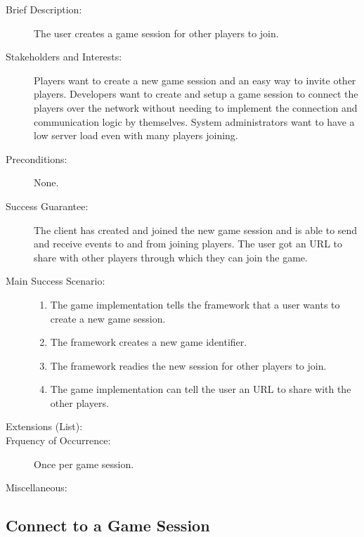 \begin{description}
  \item[Brief Description:] The user creates a game session for other players
  to join.
  \item[Stakeholders and Interests:] Players want to create a new game session
  and an easy way to invite other players. Developers want to create and setup a
  game session to connect the players over the network without needing to
  implement the connection and communication logic by themselves. System
  administrators want to have a low server load even with many players joining.
  \item[Preconditions:] None.
  \item[Success Guarantee:] The client has created and joined the new game
  session and is able to send and receive events to and from joining players.
  The user got an URL to share with other players through which they can join
  the game.
  \item[Main Success Scenario:] \hfill
  \begin{enumerate}
    \item The game implementation tells the framework that a user wants to
    create a new game session.
    \item The framework creates a new game identifier.
    \item The framework readies the new session for other players to join.
    \item The game implementation can tell the user an URL to share with the
    other players.
  \end{enumerate}
  \item[Extensions (List):] \hfill
  \item[Frquency of Occurrence:] Once per game session.
  \item[Miscellaneous:] \hfill
\end{description}

\subsection{Connect to a Game Session}

